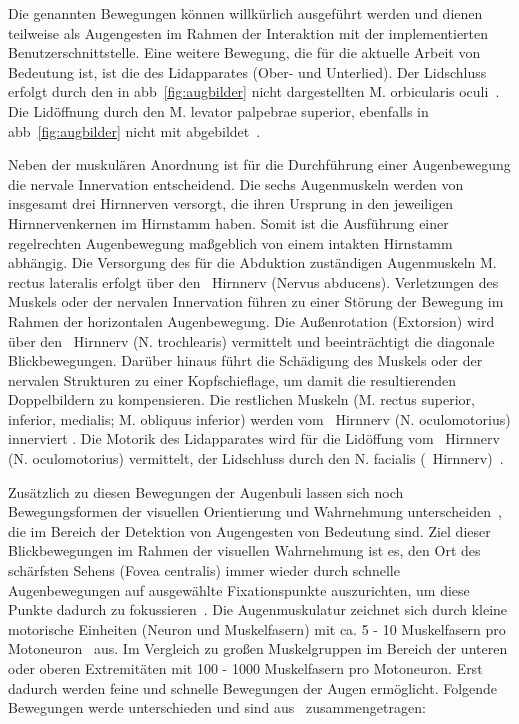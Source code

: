 Die genannten Bewegungen können willkürlich ausgeführt werden und dienen teilweise als Augengesten im Rahmen der Interaktion mit der implementierten Benutzerschnittstelle.
Eine weitere Bewegung, die für die aktuelle Arbeit von Bedeutung ist, ist die des Lidapparates (Ober- und Unterlied). Der Lidschluss erfolgt durch den in \acs{abb}~\ref{fig:augbilder} nicht dargestellten M. orbicularis oculi~\cite{Krahn2011}. Die Lidöffnung durch den M. levator palpebrae superior, ebenfalls in \acs{abb}~\ref{fig:augbilder} nicht mit abgebildet~\cite{Krahn2011}.

Neben der muskulären Anordnung ist für die Durchführung einer Augenbewegung die nervale Innervation entscheidend. Die sechs Augenmuskeln werden von insgesamt drei Hirnnerven versorgt, die ihren Ursprung in den jeweiligen Hirnnervenkernen im Hirnstamm haben. Somit ist die Ausführung einer regelrechten Augenbewegung maßgeblich von einem intakten Hirnstamm abhängig. Die Versorgung des für die Abduktion zuständigen Augenmuskeln M. rectus lateralis erfolgt über den ~Hirnnerv (Nervus abducens). Verletzungen des Muskels oder der nervalen Innervation führen zu einer Störung der Bewegung im Rahmen der horizontalen Augenbewegung. Die Außenrotation (Extorsion) wird über den ~Hirnnerv (N. trochlearis) vermittelt und beeinträchtigt die diagonale Blickbewegungen. Darüber hinaus führt die Schädigung des Muskels oder der nervalen Strukturen zu einer Kopfschieflage, um damit die resultierenden Doppelbildern zu kompensieren. Die restlichen Muskeln (M. rectus superior, inferior, medialis; M. obliquus inferior) werden vom ~Hirnnerv (N. oculomotorius) innerviert \cite{Bondke2014}. Die Motorik des Lidapparates wird für die Lidöffung vom ~Hirnnerv (N. oculomotorius) vermittelt, der Lidschluss durch den N. facialis (~Hirnnerv)~\cite{Krahn2011}.

Zusätzlich zu diesen \og Bewegungen der Augenbuli lassen sich noch Bewegungsformen der visuellen Orientierung und Wahrnehmung unterscheiden~\cite{Bondke2014}, die im Bereich der Detektion von Augengesten von Bedeutung sind. Ziel dieser Blickbewegungen im Rahmen der visuellen Wahrnehmung ist es, den Ort des schärfsten Sehens (Fovea centralis) immer wieder durch schnelle Augenbewegungen auf ausgewählte Fixationspunkte auszurichten, um diese Punkte dadurch zu fokussieren~\cite{Bondke2014}. Die Augenmuskulatur zeichnet sich durch kleine motorische Einheiten (Neuron und Muskelfasern) mit ca. 5 - 10 Muskelfasern pro Motoneuron~\cite{Bondke2014} aus. Im Vergleich zu großen Muskelgruppen im Bereich der unteren oder oberen Extremitäten mit 100 - 1000 Muskelfasern pro Motoneuron. Erst dadurch werden feine und schnelle Bewegungen der Augen ermöglicht. Folgende Bewegungen werde unterschieden und sind aus~\cite{Bondke2014,Thoemke2008,Joos2003} zusammengetragen:

